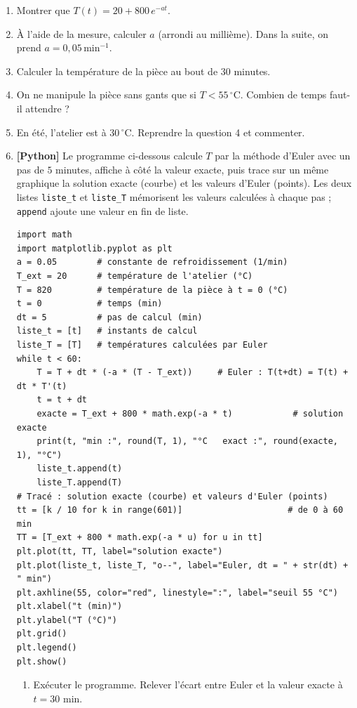 \documentclass[a4paper,11pt]{article}
\newcommand{\rep}[1]{\par\noindent\begin{minipage}[t][#1cm]{\linewidth}\mbox{}\end{minipage}\par}
\newcommand{\py}{{\color{uimmred}\small\bfseries[Python]}}
\begin{document}
\begin{enumerate}
  \needspace{4.6cm}
  \item Montrer que $T(t) = 20 + 800\,e^{-a t}$.
  \rep{3}
  \needspace{4.6cm}
  \item À l'aide de la mesure, calculer $a$ (arrondi au millième). Dans la suite, on prend $a = 0{,}05\,\text{min}^{-1}$.
  \rep{2.5}
  \needspace{3.1cm}
  \item Calculer la température de la pièce au bout de $30$ minutes.
  \rep{1.5}
  \needspace{4.6cm}
  \item On ne manipule la pièce sans gants que si $T < 55\,^\circ$C. Combien de temps faut-il attendre ?
  \rep{2.5}
  \needspace{4.6cm}
  \item En été, l'atelier est à $30\,^\circ$C. Reprendre la question 4 et commenter.
  \rep{3}
  \needspace{14cm}
  \item \py{} Le programme ci-dessous calcule $T$ par la méthode d'Euler avec un pas de $5$ minutes, affiche à côté la valeur exacte, puis trace sur un même graphique la solution exacte (courbe) et les valeurs d'Euler (points). Les deux listes \texttt{liste\_t} et \texttt{liste\_T} mémorisent les valeurs calculées à chaque pas ; \texttt{append} ajoute une valeur en fin de liste.
\begin{lstlisting}[style=uimmpython]
import math
import matplotlib.pyplot as plt
a = 0.05        # constante de refroidissement (1/min)
T_ext = 20      # température de l'atelier (°C)
T = 820         # température de la pièce à t = 0 (°C)
t = 0           # temps (min)
dt = 5          # pas de calcul (min)
liste_t = [t]   # instants de calcul
liste_T = [T]   # températures calculées par Euler
while t < 60:
    T = T + dt * (-a * (T - T_ext))     # Euler : T(t+dt) = T(t) + dt * T'(t)
    t = t + dt
    exacte = T_ext + 800 * math.exp(-a * t)            # solution exacte
    print(t, "min :", round(T, 1), "°C   exact :", round(exacte, 1), "°C")
    liste_t.append(t)
    liste_T.append(T)
# Tracé : solution exacte (courbe) et valeurs d'Euler (points)
tt = [k / 10 for k in range(601)]                     # de 0 à 60 min
TT = [T_ext + 800 * math.exp(-a * u) for u in tt]
plt.plot(tt, TT, label="solution exacte")
plt.plot(liste_t, liste_T, "o--", label="Euler, dt = " + str(dt) + " min")
plt.axhline(55, color="red", linestyle=":", label="seuil 55 °C")
plt.xlabel("t (min)")
plt.ylabel("T (°C)")
plt.grid()
plt.legend()
plt.show()
\end{lstlisting}
  \begin{enumerate}
    \item Exécuter le programme. Relever l'écart entre Euler et la valeur exacte à $t = 30$ min.

\end{enumerate}
\end{enumerate}
\end{document}
